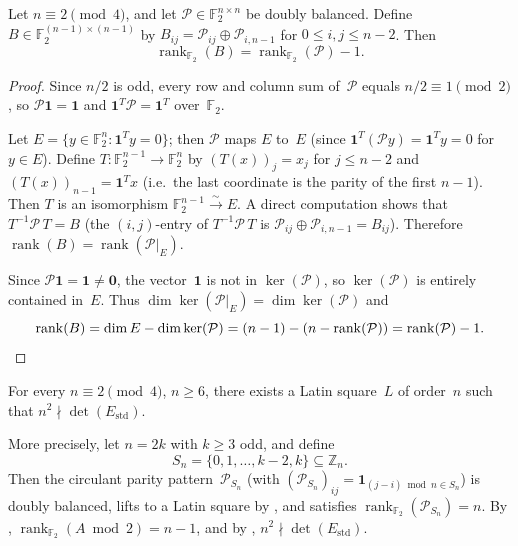 \documentclass[11pt,a4paper]{article}
\newcommand{\ZZ}{\mathbb{Z}}
\newcommand{\FF}{\mathbb{F}}
\newcommand{\one}{\mathbf{1}}
\newcommand{\rank}{\operatorname{rank}}
\newcommand{\Estd}{E_{\mathrm{std}}}
\begin{document}
\begin{lemma}\label{lem:rank-bridge}
Let $n\equiv 2\pmod{4}$, and let
$\mathcal{P}\in\FF_2^{n\times n}$ be doubly balanced.  Define
$B\in\FF_2^{(n-1)\times(n-1)}$ by
$B_{ij}=\mathcal{P}_{ij}\oplus\mathcal{P}_{i,n-1}$ for
$0\le i,j\le n-2$.  Then
\[
  \rank_{\FF_2}(B) = \rank_{\FF_2}(\mathcal{P}) - 1.
\]
\end{lemma}

\begin{proof}
Since $n/2$ is odd, every row and column sum of~$\mathcal{P}$ equals
$n/2\equiv 1\pmod{2}$, so $\mathcal{P}\one=\one$ and
$\one^T\mathcal{P}=\one^T$ over~$\FF_2$.

Let $E=\{y\in\FF_2^n:\one^Ty=0\}$; then $\mathcal{P}$ maps $E$ to~$E$
(since $\one^T(\mathcal{P}y)=\one^Ty=0$ for $y\in E$).
Define $T\colon\FF_2^{n-1}\to\FF_2^n$ by $(T(x))_j=x_j$ for
$j\le n-2$ and $(T(x))_{n-1}=\one^Tx$ (i.e.\ the last coordinate
is the parity of the first $n-1$).  Then $T$ is an isomorphism
$\FF_2^{n-1}\xrightarrow{\sim} E$.  A direct computation shows that
$T^{-1}\mathcal{P}\,T = B$ (the $(i,j)$-entry of
$T^{-1}\mathcal{P}\,T$ is
$\mathcal{P}_{ij}\oplus\mathcal{P}_{i,n-1}=B_{ij}$).
Therefore $\rank(B)=\rank(\mathcal{P}|_E)$.

Since $\mathcal{P}\one=\one\ne\mathbf{0}$, the vector~$\one$ is not in
$\ker(\mathcal{P})$, so $\ker(\mathcal{P})$ is entirely contained
in~$E$.  Thus $\dim\ker(\mathcal{P}|_E)=\dim\ker(\mathcal{P})$ and
\[
  \rank(B)=\dim E - \dim\ker(\mathcal{P})
  = (n-1)-(n-\rank(\mathcal{P}))
  = \rank(\mathcal{P})-1. \qedhere
\]
\end{proof}

\begin{theorem}\label{thm:universal-counterexamples}
For every $n\equiv 2\pmod{4}$, $n\ge 6$, there exists a Latin
square~$L$ of order~$n$ such that $n^2\nmid\det(\Estd)$.

More precisely, let $n=2k$ with $k\ge 3$ odd, and define
\[
  S_n = \{0,1,\dots,k-2,k\}\subseteq\ZZ_n.
\]
Then the circulant parity pattern~$\mathcal{P}_{S_n}$
(with $(\mathcal{P}_{S_n})_{ij}=\mathbf{1}_{(j-i)\bmod n\in S_n}$)
is doubly balanced, lifts to a Latin square by
, and satisfies
$\rank_{\FF_2}(\mathcal{P}_{S_n})=n$.  By
, $\rank_{\FF_2}(A\bmod 2)=n-1$, and by
, $n^2\nmid\det(\Estd)$.
\end{theorem}
\end{document}
